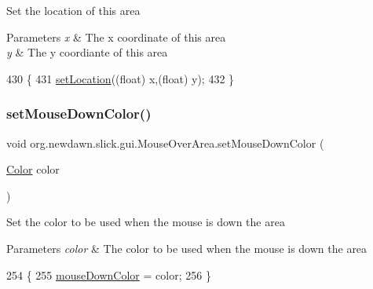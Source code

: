 Set the location of this area


\begin{DoxyParams}{Parameters}
{\em x} & The x coordinate of this area \\
\hline
{\em y} & The y coordiante of this area \\
\hline
\end{DoxyParams}

\begin{DoxyCode}
430                                           \{
431         \mbox{\hyperlink{classorg_1_1newdawn_1_1slick_1_1gui_1_1_mouse_over_area_ac55408bd04c3aa272077524dd5cc8e25}{setLocation}}((\textcolor{keywordtype}{float}) x,(\textcolor{keywordtype}{float}) y);
432     \}
\end{DoxyCode}
\mbox{\label{classorg_1_1newdawn_1_1slick_1_1gui_1_1_mouse_over_area_ac720a48f34130519cd85a659522d0408}} 
\subsubsection{\texorpdfstring{set\+Mouse\+Down\+Color()}{setMouseDownColor()}}
{\footnotesize\ttfamily void org.\+newdawn.\+slick.\+gui.\+Mouse\+Over\+Area.\+set\+Mouse\+Down\+Color (\begin{DoxyParamCaption}\item[{\mbox{\hyperlink{classorg_1_1newdawn_1_1slick_1_1_color}{Color}}}]{color }\end{DoxyParamCaption})\hspace{0.3cm}{\ttfamily [inline]}}

Set the color to be used when the mouse is down the area


\begin{DoxyParams}{Parameters}
{\em color} & The color to be used when the mouse is down the area \\
\hline
\end{DoxyParams}

\begin{DoxyCode}
254                                                \{
255         \mbox{\hyperlink{classorg_1_1newdawn_1_1slick_1_1gui_1_1_mouse_over_area_aae279f60a6db31edefb1a37e8e706180}{mouseDownColor}} = color;
256     \}
\end{DoxyCode}
\mbox{\label{classorg_1_1newdawn_1_1slick_1_1gui_1_1_mouse_over_area_a5f2d322cd2b050590e1e836929b5052f}} 
